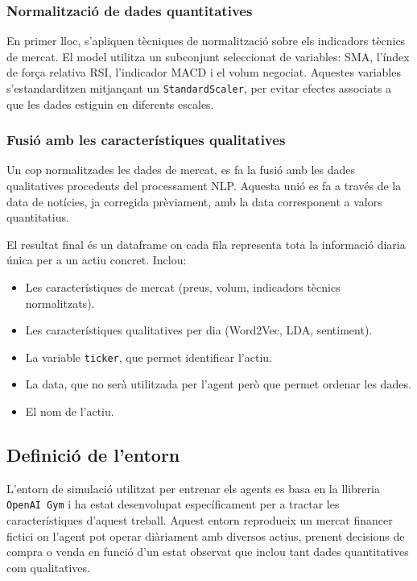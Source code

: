 \documentclass[12pt,a4paper,twoside]{book}
\begin{document}
\subsubsection{Normalització de dades quantitatives}
En primer lloc, s'apliquen tècniques de normalització sobre els indicadors tècnics de mercat. El model utilitza un subconjunt seleccionat de variables: SMA, l'índex de força relativa RSI, l'indicador MACD i el volum negociat. Aquestes variables s'estandarditzen mitjançant un \texttt{StandardScaler}, per evitar efectes associats a que les dades estiguin en diferents escales.

\subsubsection{Fusió amb les característiques qualitatives}

Un cop normalitzades les dades de mercat, es fa la fusió amb les dades qualitatives procedents del processament NLP. Aquesta unió es fa a través de la data de notícies, ja corregida prèviament, amb la data corresponent a valors quantitatius.


El resultat final és un dataframe on cada fila representa tota la informació diaria única per a un actiu concret. Inclou:
\begin{itemize}
    \item Les característiques de mercat (preus, volum, indicadors tècnics normalitzats).
    \item Les característiques qualitatives per dia (Word2Vec, LDA, sentiment).
    \item La variable \texttt{ticker}, que permet identificar l'actiu.
    \item La data, que no serà utilitzada per l'agent però que permet ordenar les dades.
    \item El nom de l'actiu.
\end{itemize}

\subsection{Definició de l'entorn}
L'entorn de simulació utilitzat per entrenar els agents es basa en la llibreria \texttt{OpenAI Gym} i ha estat desenvolupat específicament per a tractar les característiques d'aquest treball. Aquest entorn reprodueix un mercat financer fictici on l'agent pot operar diàriament amb diversos actius, prenent decisions de compra o venda en funció d'un estat observat que inclou tant dades quantitatives com qualitatives.
\end{document}
